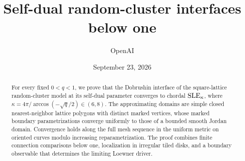 \documentclass[11pt,a4paper]{article}
\title{Self-dual random-cluster interfaces below one}
\author{OpenAI}
\date{September 23, 2026}
\begin{document}
\maketitle
\begin{abstract}
For every fixed $0<q<1$, we prove that the Dobrushin interface of the
square-lattice random-cluster model at its self-dual parameter converges
to chordal $\operatorname{SLE}_\kappa$, where
$\kappa=4\pi/\arccos(-\sqrt q/2)\in(6,8)$. The approximating domains are
simple closed nearest-neighbor lattice polygons with distinct marked
vertices, whose marked boundary parametrizations converge uniformly to
those of a bounded smooth Jordan domain. Convergence holds along the
full mesh sequence in the uniform metric on oriented curves modulo
increasing reparametrization. The proof combines finite connection
comparisons below one, localization in irregular tiled disks, and a
boundary observable that determines the limiting Loewner driver.
\end{abstract}
\tableofcontents
\clearpage










\appendix

\clearpage
{}
{}


\end{document}
